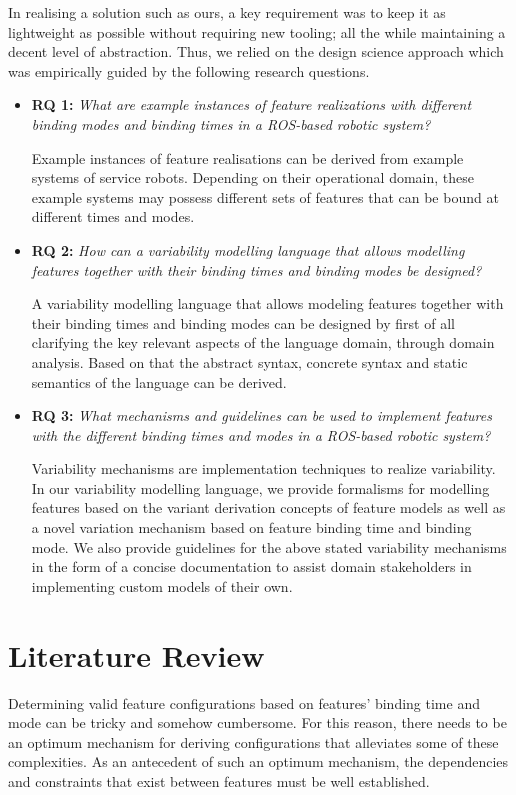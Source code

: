 \documentclass[conference]{IEEEtran}
\begin{document}
In realising a solution such as ours, a key requirement was to keep it as lightweight as possible without requiring new tooling; all the while maintaining a decent level of abstraction. Thus, we relied on the design science approach which was empirically guided by the following research questions.
\begin{itemize}
     \item \textbf{RQ 1: }\emph{What are example instances of feature realizations with different binding modes and binding times in a ROS-based robotic system?}
     
     Example instances of feature realisations can be derived from example systems of service robots. Depending on their operational domain, these example systems may possess different sets of features that can be bound at different times and modes.
    
    \item \textbf{RQ 2: } \emph{How can a variability modelling language that allows modelling features together with their binding times and binding modes be designed?}
    
    A variability modelling language that allows modeling features together with their binding times and binding modes can be designed by first of all clarifying the key relevant aspects of the language domain, through domain analysis. Based on that the abstract syntax, concrete syntax and static semantics of the language can be derived.
    
    \item \textbf{RQ 3:} \emph{What mechanisms and guidelines can be used to implement features with the different binding times and modes in a ROS-based robotic system?}
    
    Variability mechanisms are implementation techniques to realize variability. In our variability modelling language, we provide formalisms for modelling features based on the variant derivation concepts of feature models as well as a novel variation mechanism based on feature binding time and binding mode. We also provide guidelines for the above stated variability mechanisms in the form of a concise documentation to assist domain stakeholders in implementing custom models of their own.
\end{itemize}

\section{Literature Review}
Determining valid feature configurations based on features'  binding time and mode can be tricky and somehow cumbersome. For this reason, there needs to be an optimum mechanism for deriving configurations that alleviates some of these complexities. As an antecedent of such an optimum mechanism, the dependencies and constraints that exist between features must be well established.
\end{document}
